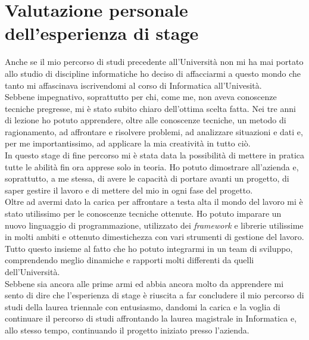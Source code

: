 \section{Valutazione personale dell'esperienza di stage}
Anche se il mio percorso di studi precedente all'Università non mi ha mai portato allo studio di discipline informatiche ho deciso di affacciarmi a questo mondo che tanto mi affascinava iscrivendomi al corso di Informatica all'Univesità. \\
Sebbene impegnativo, soprattutto per chi, come me, non aveva conoscenze tecniche pregresse, mi è stato subito chiaro dell'ottima scelta fatta. Nei tre anni di lezione ho potuto apprendere, oltre alle conoscenze tecniche, un metodo di ragionamento, ad affrontare e risolvere problemi, ad analizzare situazioni e dati e, per me importantissimo, ad applicare la mia creatività in tutto ciò.\\
In questo stage di fine percorso mi è stata data la possibilità di mettere in pratica tutte le abilità fin ora apprese solo in teoria. Ho potuto dimostrare all'azienda e, soprattutto, a me stessa, di avere le capacità di portare avanti un progetto, di saper gestire il lavoro e di mettere del mio in ogni fase del progetto.\\
Oltre ad avermi dato la carica per affrontare a testa alta il mondo del lavoro mi è stato utilissimo per le conoscenze tecniche ottenute. Ho potuto imparare un nuovo linguaggio di programmazione, utilizzato dei \emph{framework} e librerie utilissime in molti ambiti e ottenuto dimestichezza con vari strumenti di gestione del lavoro. Tutto questo insieme al fatto che ho potuto integrarmi in un team di sviluppo, comprendendo meglio dinamiche e rapporti molti differenti da quelli dell'Università.\\
Sebbene sia ancora alle prime armi ed abbia ancora molto da apprendere mi sento di dire che l'esperienza di stage è riuscita a far concludere il mio percorso di studi della laurea triennale con entusiasmo, dandomi la carica e la voglia di continuare il percorso di studi affrontando la laurea magistrale in Informatica e, allo stesso tempo, continuando il progetto iniziato presso l'azienda.